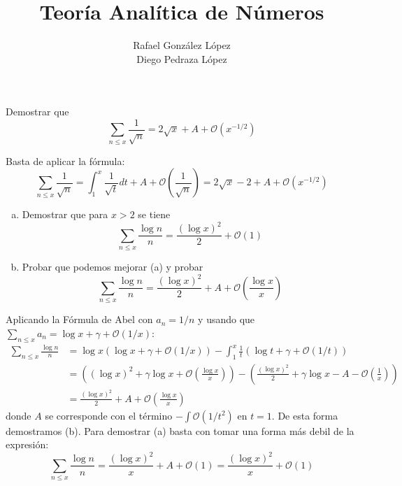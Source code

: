 \documentclass[twoside]{article}
\begin{document}
\title{Teoría Analítica de Números}
\author{Rafael González López\\Diego Pedraza López}
\maketitle

\begin{ejercicio}{1}
Demostrar que
\[ \sum_{n≤x} \frac{1}{\sqrt{n}} =  2 \sqrt{x} + A + \mathcal{O}(x^{-1/2}) \]
\end{ejercicio}
\begin{sol}
Basta de aplicar la fórmula:
\[ \sum_{n≤x} \frac{1}{\sqrt{n}} = \int_1^x \frac{1}{\sqrt{t}}dt + A + \mathcal{O}\left(\frac{1}{\sqrt{n}}\right) = 2 \sqrt{x}-2+A + \mathcal{O}(x^{-1/2}) \]
\end{sol}

\newpage

\begin{ejercicio}{2}\mbox{}
\begin{enumerate}[(a)]
	\item Demostrar que para $x > 2$ se tiene
	\[ \sum_{n≤x} \frac{\log n}{n} = \frac{(\log x)^2}{2} + \mathcal{O}(1) \]
	\item Probar que podemos mejorar (a) y probar
	\[ \sum_{n≤x} \frac{\log n}{n} = \frac{(\log x)^2}{2} + A + \mathcal{O}\left(\frac{\log x}{x}\right) \]
\end{enumerate}
\end{ejercicio}
\begin{sol}
Aplicando la Fórmula de Abel con $a_n=1/n$ y usando que $\sum_{n≤x} a_n = \log x + γ + \mathcal{O}(1/x)$:
\begin{align*}
	\sum_{n≤x} \frac{\log n}{n} & = \log x (\log x + γ + \mathcal{O}(1/x)) - \int_1^x \frac{1}{t}(\log t + γ + \mathcal{O}(1/t))\\
	& = \left((\log x)^2 + γ\log x + \mathcal{O}\left(\frac{\log x}{x}\right)\right) - \left(\frac{(\log x)^2}{2} + γ\log x - A - \mathcal{O}\left(\frac{1}{x}\right)\right)\\
	& = \frac{(\log x)^2}{2} + A + \mathcal{O}\left(\frac{\log x}{x}\right)
\end{align*}
donde $A$ se corresponde con el término $-\int \mathcal{O}(1/t^2)$ en $t=1$. De esta forma demostramos (b). Para demostrar (a) basta con tomar una forma más debil de la expresión:
\[ \sum_{n≤x} \frac{\log n}{n} = \frac{(\log x)^2}{x} + A + \mathcal{O}(1) = \frac{(\log x)^2}{x} + \mathcal{O}(1) \]
\end{sol}
\end{document}
